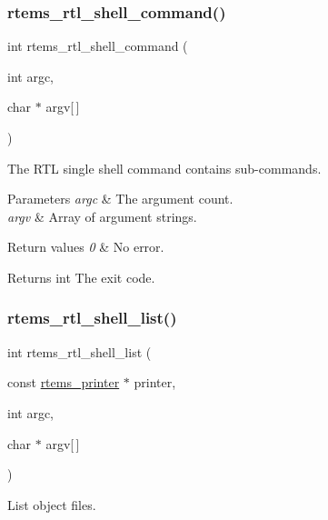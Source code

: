 \subsubsection{\texorpdfstring{rtems\_rtl\_shell\_command()}{rtems\_rtl\_shell\_command()}}
{\footnotesize\ttfamily int rtems\+\_\+rtl\+\_\+shell\+\_\+command (\begin{DoxyParamCaption}\item[{int}]{argc,  }\item[{char $\ast$}]{argv\mbox{[}$\,$\mbox{]} }\end{DoxyParamCaption})}

The R\+TL single shell command contains sub-\/commands.


\begin{DoxyParams}{Parameters}
{\em argc} & The argument count. \\
\hline
{\em argv} & Array of argument strings. \\
\hline
\end{DoxyParams}

\begin{DoxyRetVals}{Return values}
{\em 0} & No error. \\
\hline
\end{DoxyRetVals}
\begin{DoxyReturn}{Returns}
int The exit code. 
\end{DoxyReturn}
\mbox{\label{rtl-shell_8h_a1f9b3cb0aafe4ed009d797499b64e9e4}} 
\subsubsection{\texorpdfstring{rtems\_rtl\_shell\_list()}{rtems\_rtl\_shell\_list()}}
{\footnotesize\ttfamily int rtems\+\_\+rtl\+\_\+shell\+\_\+list (\begin{DoxyParamCaption}\item[{const \mbox{\hyperlink{structrtems__printer}{rtems\+\_\+printer}} $\ast$}]{printer,  }\item[{int}]{argc,  }\item[{char $\ast$}]{argv\mbox{[}$\,$\mbox{]} }\end{DoxyParamCaption})}

List object files. \mbox{\label{rtl-shell_8h_ab9ed5fe1cd6d728c22f423a566b3ec1e}} 
